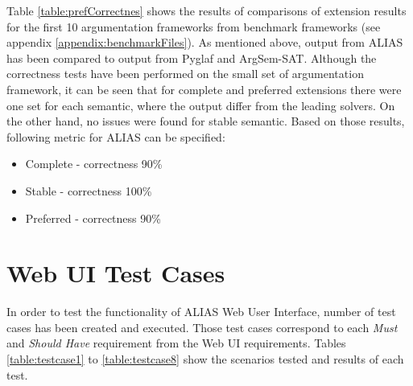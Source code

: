 Table \ref{table:prefCorrectnes} shows the results of comparisons of extension results for the first 10 argumentation frameworks from benchmark frameworks (see appendix \ref{appendix:benchmarkFiles}). As mentioned above, output from ALIAS has been compared to output from Pyglaf and ArgSem-SAT. Although the correctness tests have been performed on the small set of argumentation framework, it can be seen that for complete and preferred extensions there were one set for each semantic, where the output differ from the leading solvers. On the other hand, no issues were found for stable semantic. Based on those results, following metric for ALIAS can be specified:
\begin{itemize}
	\item Complete - correctness 90\%
	\item Stable - correctness 100\%
	\item Preferred - correctness 90\%
\end{itemize}


\section{Web UI Test Cases} \label{section:testCases}
In order to test the functionality of ALIAS Web User Interface, number of test cases has been created and executed. Those test cases correspond to each \textit{Must} and \textit{Should Have} requirement from the Web UI requirements. Tables \ref{table:testcase1} to \ref{table:testcase8} show the scenarios tested and results of each test.

